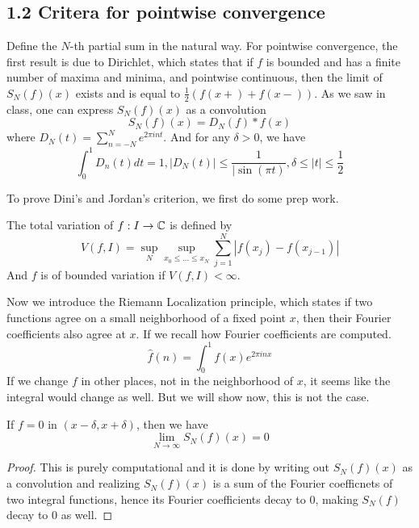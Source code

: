 \subsection{1.2 Critera for pointwise convergence}
Define the $N$-th partial sum in the natural way. For pointwise convergence, the first result is due to Dirichlet, which states that if $f$ is bounded and has a finite number of maxima and minima, and pointwise continuous, then the limit of $S_N(f)(x)$ exists and is equal to $\frac{1}{2}(f(x+)+f(x-))$. As we saw in class, one can express $S_N(f)(x)$ as a convolution
\begin{equation*}
    S_N(f)(x)=D_N(f)\ast f(x)
\end{equation*}
where $D_N(t)=\sum_{n=-N}^Ne^{2\pi int}$. And for any $\delta>0$, we have
\begin{equation*}
    \int_0^1D_n(t)dt=1, |D_N(t)|\leq\frac{1}{|\sin(\pi t)}, \delta\leq |t|\leq\frac{1}{2}
\end{equation*}

To prove Dini's and Jordan's criterion, we first do some prep work.
\begin{definition}
    The total variation of $f:I\to\mathbb{C}$ is defined by
    \begin{equation*}
        V(f,I)=\sup_N\sup_{x_0\leq...\leq x_N}\sum_{j=1}^N|f(x_j)-f(x_{j-1})|
    \end{equation*}
    And $f$ is of bounded variation if $V(f,I)<\infty$.
\end{definition}

Now we introduce the Riemann Localization principle, which states if two functions agree on a small neighborhood of a fixed point $x$, then their Fourier coefficients also agree at $x$. If we recall how Fourier coefficients are computed.
\begin{equation*}
    \hat{f}(n)=\int_0^1f(x)e^{2\pi inx}
\end{equation*} 
If we change $f$ in other places, not in the neighborhood of $x$, it seems like the integral would change as well. But we will show now, this is not the case.

\begin{theorem}
    If $f=0$ in $(x-\delta, x+\delta)$, then we have
    \begin{equation*}
        \lim_{N\to\infty}S_N(f)(x)=0
    \end{equation*}
\end{theorem}
\begin{proof}
    This is purely computational and it is done by writing out $S_N(f)(x)$ as a convolution and realizing $S_N(f)(x)$ is a sum of the Fourier coefficnets of two integral functions, hence its Fourier coefficients decay to 0, making $S_N(f)$ decay to 0 as well.
\end{proof}

